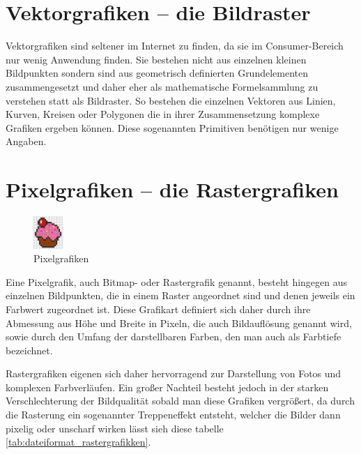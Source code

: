\section{Vektorgrafiken – die Bildraster}
\label{sec:vektorgrafiken_-_die_bildraster}

Vektorgrafiken sind seltener im Internet zu finden, da sie im Consumer-Bereich nur wenig Anwendung finden. Sie bestehen nicht aus einzelnen kleinen Bildpunkten sondern sind aus geometrisch definierten Grundelementen zusammengesetzt und daher eher als mathematische Formelsammlung zu verstehen statt als Bildraster. So bestehen die einzelnen Vektoren aus Linien, Kurven, Kreisen oder Polygonen die in ihrer Zusammensetzung komplexe Grafiken ergeben können. Diese sogenannten Primitiven benötigen nur wenige Angaben. \\

\section{Pixelgrafiken – die Rastergrafiken}
\label{sec:pixelgrafiken_-_die_rastergrafiken}

\begin{figure}
\centering
\includegraphics[width=0.10\textwidth]{img/k1_pixel_img.jpg}
\caption{\label{fig:frog1}Pixelgrafiken}
\end{figure}

Eine Pixelgrafik, auch Bitmap- oder Rastergrafik genannt, besteht hingegen aus einzelnen Bildpunkten, die in einem Raster angeordnet sind und denen jeweils ein Farbwert zugeordnet ist. Diese Grafikart definiert sich daher durch ihre Abmessung aus Höhe und Breite in Pixeln, die auch Bildauflösung genannt wird, sowie durch den Umfang der darstellbaren Farben, den man auch als Farbtiefe bezeichnet.

\vspace{5mm}

Rastergrafiken eigenen sich daher hervorragend zur Darstellung von Fotos und komplexen Farbverläufen. Ein großer Nachteil besteht jedoch in der starken Verschlechterung der Bildqualität sobald man diese Grafiken vergrößert, da durch die Rasterung ein sogenannter Treppeneffekt entsteht, welcher die Bilder dann pixelig oder unscharf wirken lässt sieh diese tabelle \ref{tab:dateiformat_rastergrafikken}. 


